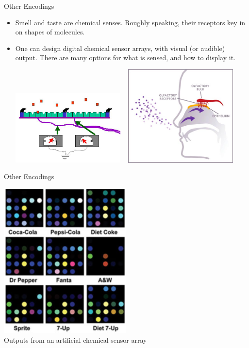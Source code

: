 \documentclass{beamer}
\begin{document}
\begin{frame}{Other Encodings}
   \begin{itemize}
      \item Smell and taste are chemical senses. Roughly speaking, their receptors key in on shapes of molecules.
      \item One can design digital chemical sensor arrays, with visual (or audible) output. There are many options for what is sensed, and how to display it.
      \begin{center}
         \includegraphics[width=0.45\textwidth]{figures/noseshapes.jpg}
         ~ \includegraphics[width=0.45\textwidth]{figures/smell.jpg}
      \end{center}
   \end{itemize}
\end{frame}

\begin{frame}{Other Encodings}
   \begin{center}
      \includegraphics[width=0.5\textwidth]{figures/sodapop.png}
      \\Outputs from an artificial chemical sensor array
   \end{center}
\end{frame}
\end{document}
